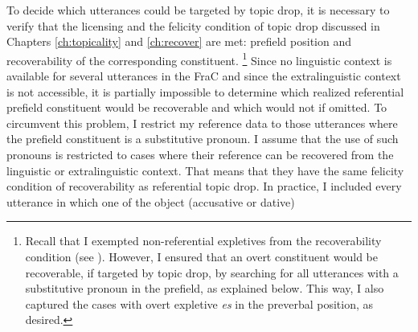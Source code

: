 To decide which utterances could be targeted by topic drop, it is necessary to verify that the licensing and the felicity condition of topic drop discussed in Chapters \ref{ch:topicality} and \ref{ch:recover} are met: prefield position  and recoverability  of the corresponding constituent.%
\footnote{Recall that I exempted non-referential expletives  from the recoverability  condition (see ).
 However,  I ensured that an overt constituent would be recoverable, if targeted by topic drop, by searching for all utterances with a substitutive pronoun in the prefield, as explained below.
This way, I also captured the cases with overt expletive \textit{es} in the preverbal position, as desired.
}
%
Since no linguistic context is available for several utterances in the FraC and since the extralinguistic context is not accessible, it is partially impossible to determine which realized referential prefield constituent would be recoverable and which would not if omitted.
To circumvent this problem, I restrict my reference data to those utterances where the prefield constituent is a substitutive pronoun.
I assume that the use of such pronouns is restricted to cases where their reference can be recovered from the linguistic or extralinguistic context.
That means that they have the same felicity condition of recoverability as referential topic drop.
In practice, I included every utterance in which one of the object (accusative  or dative)%
